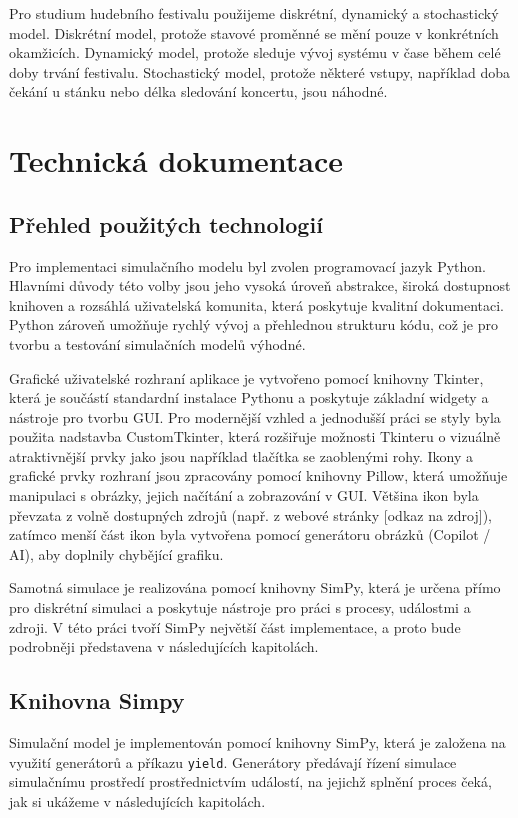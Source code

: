 \documentclass[
  program=itp,
  biblatex,
  figures=false,
  glossaries,
  index
]{kidiplom}
\begin{document}
Pro studium hudebního festivalu použijeme diskrétní, dynamický a stochastický model. Diskrétní model, protože stavové proměnné se mění pouze v konkrétních okamžicích. Dynamický model, protože sleduje vývoj systému v čase během celé doby trvání festivalu. Stochastický model, protože některé vstupy, například doba čekání u stánku nebo délka sledování koncertu, jsou náhodné.

\section{Technická dokumentace}


\subsection{Přehled použitých technologií}
Pro implementaci simulačního modelu byl zvolen programovací jazyk Python. Hlavními důvody této volby jsou jeho vysoká úroveň abstrakce, široká dostupnost knihoven a rozsáhlá uživatelská komunita, která poskytuje kvalitní dokumentaci. Python zároveň umožňuje rychlý vývoj a přehlednou strukturu kódu, což je pro tvorbu a testování simulačních modelů výhodné.

Grafické uživatelské rozhraní aplikace je vytvořeno pomocí knihovny Tkinter, která je součástí standardní instalace Pythonu a poskytuje základní widgety a nástroje pro tvorbu GUI. Pro modernější vzhled a jednodušší práci se styly byla použita nadstavba CustomTkinter, která rozšiřuje možnosti Tkinteru o vizuálně atraktivnější prvky jako jsou například tlačítka se zaoblenými rohy. Ikony a grafické prvky rozhraní jsou zpracovány pomocí knihovny Pillow, která umožňuje manipulaci s obrázky, jejich načítání a zobrazování v GUI. Většina ikon byla převzata z volně dostupných zdrojů (např. z webové stránky [odkaz na zdroj]), zatímco menší část ikon byla vytvořena pomocí generátoru obrázků (Copilot / AI), aby doplnily chybějící grafiku.

Samotná simulace je realizována pomocí knihovny SimPy, která je určena přímo pro diskrétní simulaci a poskytuje nástroje pro práci s procesy, událostmi a zdroji. V této práci tvoří SimPy největší část implementace, a proto bude podrobněji představena v následujících kapitolách.

\subsection{Knihovna Simpy}
Simulační model je implementován pomocí knihovny SimPy, která je založena na využití generátorů a příkazu \texttt{yield}. 
Generátory předávají řízení simulace simulačnímu prostředí prostřednictvím událostí, 
na jejichž splnění proces čeká, jak si ukážeme v následujících kapitolách.
\end{document}
